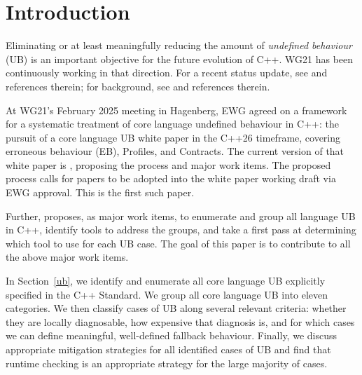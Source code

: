 


\section{Introduction}
\label{intro}

Eliminating or at least meaningfully reducing the amount of \emph{undefined behaviour} (UB) is an important objective for the future evolution of C++. WG21 has been continuously working in that direction. For a recent status update, see \cite{Sutter2025} and references therein; for background, see \cite{Sutter2024} and references therein.

At WG21's February 2025 meeting in Hagenberg, EWG agreed on a framework for a systematic
treatment of core language undefined behaviour in C++: the pursuit of a core language UB white paper in the C++26 timeframe, covering erroneous behaviour (EB), Profiles, and Contracts. The current version of that white paper is \cite{P3656R1}, proposing the process and major work items. The proposed process calls for papers to be adopted into the white paper working draft via EWG approval. This is the first such paper.

Further, \cite{P3656R1} proposes, as major work items, to enumerate and group all language UB in C++, identify tools to address the groups, and take a first pass at determining which tool to use for each UB case. The goal of this paper is to contribute to all the above major work items.

In Section~\ref{ub}, we identify and enumerate all core language UB explicitly specified in the C++ Standard. We group all core language UB into eleven categories. We then classify cases of UB along several relevant criteria: whether they are locally diagnosable, how expensive that diagnosis is, and for which cases we can define meaningful, well-defined fallback behaviour. Finally, we discuss appropriate mitigation strategies for all identified cases of UB and find that runtime checking is an appropriate strategy for the large majority of cases.

